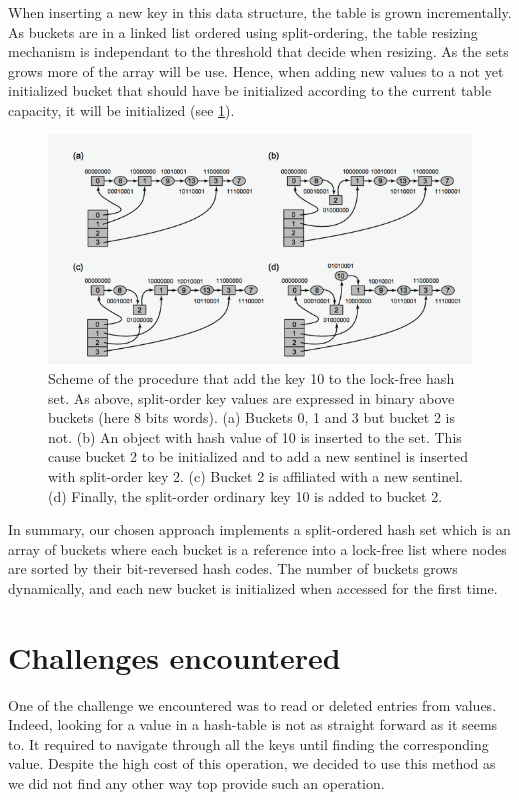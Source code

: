 \documentclass[a4paper,11pt]{report}
\begin{document}
    When inserting a new key in this data structure, the table is grown incrementally.
    As buckets are in a linked list ordered using split-ordering, the table resizing mechanism is independant to
    the threshold that decide when resizing. As the sets grows more of the array will be use. Hence, when adding
    new values to a not yet initialized bucket that should have be initialized according to the current table capacity,
    it will be initialized (see \ref{fig:Fig2}).


    \begin{figure}[h]
        \centering
            \includegraphics{images/hashsetFig2.png}
        \caption{Scheme of the procedure that add the key 10 to the lock-free hash set.
        As above, split-order key values are expressed in binary above buckets (here 8 bits words).
        (a) Buckets 0, 1 and 3 but bucket 2 is not.
        (b) An object with hash value of 10 is inserted to the set. This cause bucket 2 to be initialized and to
        add a new sentinel is inserted with split-order key 2.
        (c) Bucket 2 is affiliated with a new sentinel.
        (d) Finally, the split-order ordinary key 10 is added to bucket 2.}
        \label{fig:Fig2}
    \end{figure}

    In summary, our chosen approach implements a split-ordered hash set which is an array of buckets where each bucket
    is a reference into a lock-free list where nodes are sorted by their bit-reversed hash codes.
    The number of buckets grows dynamically, and each new bucket is initialized when accessed for the first time.

    \section*{Challenges encountered}
    One of the challenge we encountered was to read or deleted entries from values.
    Indeed, looking for a value in a hash-table is not as straight forward as it seems to.
    It required to navigate through all the keys until finding the corresponding value.
    Despite the high cost of this operation, we decided to use this method as we did not find any other way top provide
    such an operation.
\end{document}
